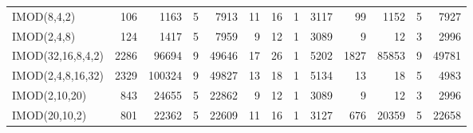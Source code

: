 \documentclass{article}
\begin{document}
\begin{table}[t]
{\begin{tabular}[t]{l|rrrr|rrrr|rrrr}
IMOD(8,4,2)	& 106	& 1163	& 5	& 7913	& 11	& 16	& 1	& 3117	& 99	& 1152	& 5	& 7927\\
IMOD(2,4,8)	& 124	& 1417	& 5	& 7959	& 9	& 12	& 1	& 3089	& 9	& 12	& 3	& 2996\\
IMOD(32,16,8,4,2)	& 2286	& 96694	& 9	& 49646	& 17	& 26	& 1	& 5202	& 1827	& 85853	& 9	& 49781\\
IMOD(2,4,8,16,32)	& 2329	& 100324	& 9	& 49827	& 13	& 18	& 1	& 5134	& 13	& 18	& 5	& 4983\\
IMOD(2,10,20)	& 843	& 24655	& 5	& 22862	& 9	& 12	& 1	& 3089	& 9	& 12	& 3	& 2996\\
IMOD(20,10,2)	& 801	& 22362	& 5	& 22609	& 11	& 16	& 1	& 3127	& 676	& 20359	& 5	& 22658\\
\end{tabular}}
\end{table}
\end{document}
